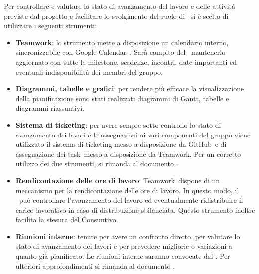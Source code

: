 \documentclass[../PianoProgetto.tex]{subfiles}
\begin{document}
Per controllare e valutare lo stato di avanzamento del lavoro e delle attività previste dal progetto e facilitare lo svolgimento del ruolo di \responsabilediprogetto\ si è scelto di utilizzare i seguenti strumenti:
	\begin{itemize}
	\item \textbf{Teamwork}: lo strumento mette a disposizione un calendario interno, sincronizzabile con Google Calendar\g\ . Sarà compito del \responsabilediprogetto\ mantenerlo aggiornato con tutte le milestone\g, scadenze, incontri, date importanti ed eventuali indisponibilità dei membri del gruppo.
	\item \textbf{Diagrammi, tabelle e grafici}: per rendere più efficace la visualizzazione della pianificazione sono stati realizzati diagrammi di Gantt, tabelle e diagrammi riassuntivi.
	\item \textbf{Sistema di ticketing}: per avere sempre sotto controllo lo stato di avanzamento dei lavori e le assegnazioni ai vari componenti del gruppo viene utilizzato il sistema di ticketing messo a disposizione da GitHub\g\ e di assegnazione dei task\g\ messo a disposizione da Teamwork\g. Per un corretto utilizzo dei due strumenti, si rimanda al documento \normediprogettov .
	\item \textbf{Rendicontazione delle ore di lavoro}: Teamwork\g\ dispone di un meccanismo per la rendicontazione delle ore di lavoro. In questo modo, il \responsabilediprogetto\ può controllare l'avanzamento del lavoro ed eventualmente ridistribuire il carico lavorativo in caso di distribuzione sbilanciata. Questo strumento inoltre facilita la stesura del \hyperref[sec:consuntivo]{Consuntivo}.
	\item \textbf{Riunioni interne}: tenute per avere un confronto diretto, per valutare lo stato di avanzamento dei lavori e per prevedere migliorie o variazioni a quanto già pianificato. Le riunioni interne saranno convocate dal \responsabilediprogetto . Per ulteriori approfondimenti si rimanda al documento \normediprogettov .
	\end{itemize}
	
\end{document}
